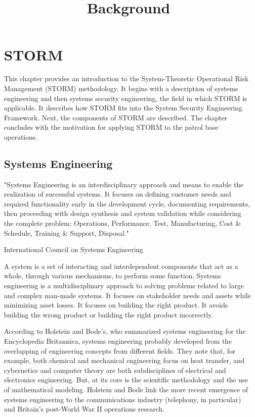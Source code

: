 \documentclass[../../main/main.tex]{subfiles}
\begin{document}
\title{Background}


\chapter{STORM}\label{chp:srorm}
This chapter provides an introduction to the System-Theoretic Operational Risk Management (STORM) methodology.  It begins with a description of systems engineering and then systems security engineering, the field in which STORM is applicable. It describes how STORM fits into the System Security Engineering Framework.  Next, the components of STORM are described.  The chapter concludes with the motivation for applying STORM to the patrol base operations.

\section{Systems Engineering}\label{sec:stormse}
"Systems Engineering is an interdisciplinary approach and means to enable the realization of successful systems. It focuses on defining customer needs and required functionality early in the development cycle, documenting requirements, then proceeding with design synthesis and system validation while considering the complete problem: Operations, Performance, Test, Manufacturing, Cost \& Schedule, Training \& Support, Disposal."

International Council on Systems Engineering 

A system is a set of interacting and interdependent components that act as a whole,  through various mechanisms, to perform some function. Systems engineering is a multidisciplinary approach to solving problems related to large and complex man-made systems.  It focuses on stakeholder needs and assets while minimizing asset losses.  It focuses on building the right product.  It avoids building the wrong product or building the right product incorrectly.  

According to Holstein and Bode's, who summarized systems engineering for the Encyclopedia Britannica, systems engineering probably developed from the overlapping of engineering concepts from different fields. They note that, for example, both chemical and mechanical engineering focus on heat transfer, and cybernetics and computer theory are both subdisciplines of electrical and electronics engineering.   But, at its core is the scientific methodology and the use of mathematical modeling.  Holstein and Bode link the more recent emergence of systems engineering to the communications industry (telephony, in particular) and Britain's post-World War II operations research.
\end{document}
